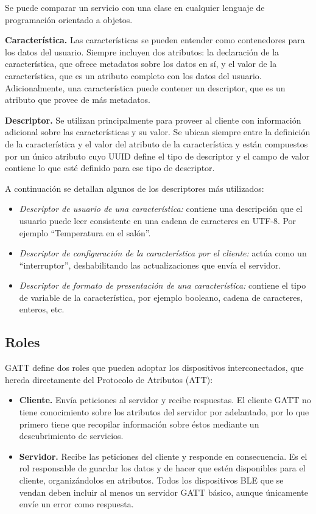 Se puede comparar un servicio con una clase en cualquier lenguaje de programación orientado a objetos. 

\textbf{Característica.} Las características se pueden entender como contenedores para los datos del usuario. Siempre incluyen dos atributos: la declaración de la característica, que ofrece metadatos sobre los datos en sí, y el valor de la característica, que es un atributo completo con los datos del usuario. Adicionalmente, una característica puede contener un descriptor, que es un atributo que provee de más metadatos.

\textbf{Descriptor.} Se utilizan principalmente para proveer al cliente con información adicional sobre las características y su valor. Se ubican siempre entre la definición de la característica y el valor del atributo de la característica y están compuestos por un único atributo cuyo UUID define el tipo de descriptor y el campo de valor contiene lo que esté definido para ese tipo de descriptor.

A continuación se detallan algunos de los descriptores más utilizados:

\begin{itemize}
	\item \textit{Descriptor de usuario de una característica:} contiene una descripción que el usuario puede leer consistente en una cadena de caracteres en UTF-8. Por ejemplo “Temperatura en el salón”.
	\item \textit{Descriptor de configuración de la característica por el cliente:} actúa como un “interruptor”, deshabilitando las actualizaciones que envía el servidor.
	\item \textit{Descriptor de formato de presentación de una característica:} contiene el tipo de variable de la característica, por ejemplo booleano, cadena de caracteres, enteros, etc.
\end{itemize}

\subsection{Roles}
\label{makereference2.4.2}

GATT define dos roles que pueden adoptar los dispositivos interconectados, que hereda directamente del Protocolo de Atributos (ATT):
\begin{itemize}
	\item \textbf{Cliente.} Envía peticiones al servidor y recibe respuestas. El cliente GATT no tiene conocimiento sobre los atributos del servidor por adelantado, por lo que primero tiene que recopilar información sobre éstos mediante un descubrimiento de servicios.

	\item \textbf{Servidor.} Recibe las peticiones del cliente y responde en consecuencia. Es el rol responsable de guardar los datos y de hacer que estén disponibles para el cliente, organizándolos en atributos. Todos los dispositivos BLE que se vendan deben incluir al menos un servidor GATT básico, aunque únicamente envíe un error como respuesta.
\end{itemize}

